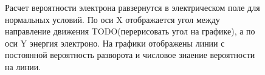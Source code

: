 \begin{figure}[ph!]
    \begin{center}
        \begin{minipage}[h]{0.49\linewidth}
        \end{minipage}
        \hfill
        \begin{minipage}[h]{0.49\linewidth}
        \end{minipage}
        \vfill
        \begin{minipage}[h]{0.49\linewidth}
        \end{minipage}
        \hfill
        \begin{minipage}[h]{0.49\linewidth}
        \end{minipage}
        \vfill
        \begin{minipage}[h]{0.49\linewidth}
        \end{minipage}
        \hfill
        \begin{minipage}[h]{0.49\linewidth}
        \end{minipage}
        \caption{Расчет вероятности электрона равзернутся в электрическом поле для нормальных условий. По оси X отображается угол между направление движения TODO(перерисовать угол на графике), а по оси Y энергия электроно. На графики отображены линии с постоянной вероятность разворота и числовое знаение вероятности на линии.}
    \end{center}
    \label{fig:storm:reverse_nc_1}
\end{figure}
